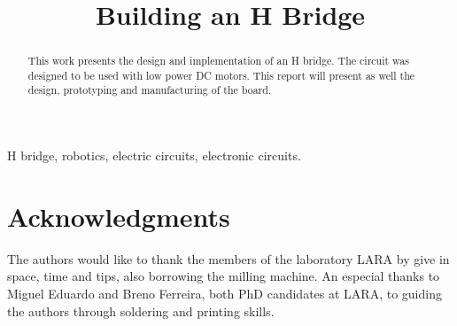 \documentclass[journal]{IEEEtran}
\begin{document}
    \title{Building an H Bridge}
    
    \author{
        }
    
    \maketitle
    
    \begin{abstract}
        
        This work presents the design and implementation of an H bridge. The circuit was designed to be used with low power DC motors. This report will present as well the design, prototyping and manufacturing of the board.
                
    \end{abstract}
    
    \begin{IEEEkeywords}
        H bridge, robotics, electric circuits, electronic circuits.        
    \end{IEEEkeywords}
    
 
    
    
    
    
    
    

    \section{Acknowledgments} %
    \label{sec:acknowledgments}
        The authors would like to thank the members of the laboratory LARA by give in space, time and tips, also borrowing the milling machine. An especial thanks to Miguel Eduardo and Breno Ferreira, both PhD candidates at LARA, to guiding the authors through soldering and printing skills.
    
    
    
    
    
    
\end{document}
